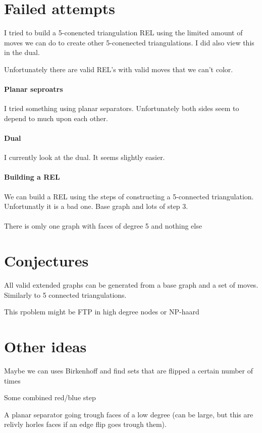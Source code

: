 \section{Failed attempts}
I tried to build a 5-conencted triangulation REL using the limited amount of moves we can do to create other 5-conenected triangulations. I did also view this in the dual.

Unfortunately there are valid REL's with valid moves that we can't color.

\paragraph{Planar seproatrs}
I tried something using planar separators. Unfortunately both sides seem to depend to much upon each other.

\paragraph{Dual}
I currently look at the dual. It seems slightly easier.

\paragraph{Building a REL}
We can build a REL using the steps of constructing a 5-connected triangulation. Unfortunatly it is a bad one.
Base graph and lots of step 3.


\paragraph{}
There is omly one graph with faces of degree 5 and nothing else


\section{Conjectures}
All valid extended graphs can be generated from a base graph and a set of moves. Similarly to 5 connected triangulations.

This rpoblem might be FTP in high degree nodes or NP-haard


\section{Other ideas}
Maybe we can uses Birkenhoff and find sets that are flipped a certain number of times

Some combined red/blue step

A planar separator going trough faces of a low degree (can be large, but this are relivly horles faces if an edge flip goes trough them).

